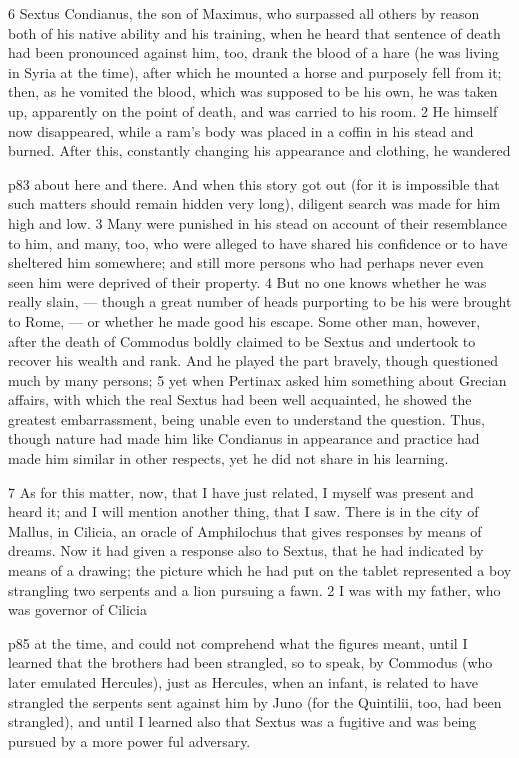 6
Sextus Condianus, the son of Maximus, who surpassed all others by reason both of his native ability and his training, when he heard that sentence of death had been pronounced against him, too, drank the blood of a hare (he was living in Syria at the time), after which he mounted a horse and purposely fell from it; then, as he vomited the blood, which was supposed to be his own, he was taken up, apparently on the point of death, and was carried to his room. 2 He himself now disappeared, while a ram's body was placed in a coffin in his stead and burned. After this, constantly changing his appearance and clothing, he wandered

p83 about here and there. And when this story got out (for it is impossible that such matters should remain hidden very long), diligent search was made for him high and low. 3 Many were punished in his stead on account of their resemblance to him, and many, too, who were alleged to have shared his confidence or to have sheltered him somewhere; and still more persons who had perhaps never even seen him were deprived of their property. 4 But no one knows whether he was really slain, \texthebrew{—} though a great number of heads purporting to be his were brought to Rome, \texthebrew{—} or whether he made good his escape. Some other man, however, after the death of Commodus boldly claimed to be Sextus and undertook to recover his wealth and rank. And he played the part bravely, though questioned much by many persons; 5 yet when Pertinax asked him something about Grecian affairs, with which the real Sextus had been well acquainted, he showed the greatest embarrassment, being unable even to understand the question. Thus, though nature had made him like Condianus in appearance and practice had made him similar in other respects, yet he did not share in his learning.

7
As for this matter, now, that I have just related, I myself was present and heard it; and I will mention another thing, that I saw. There is in the city of Mallus, in Cilicia, an oracle of Amphilochus that gives responses by means of dreams. Now it had given a response also to Sextus, that he had indicated by means of a drawing; the picture which he had put on the tablet represented a boy strangling two serpents and a lion pursuing a fawn. 2 I was with my father, who was governor of Cilicia

p85 at the time, and could not comprehend what the figures meant, until I learned that the brothers had been strangled, so to speak, by Commodus (who later emulated Hercules), just as Hercules, when an infant, is related to have strangled the serpents sent against him by Juno (for the Quintilii, too, had been strangled), and until I learned also that Sextus was a fugitive and was being pursued by a more power ­ful adversary.

